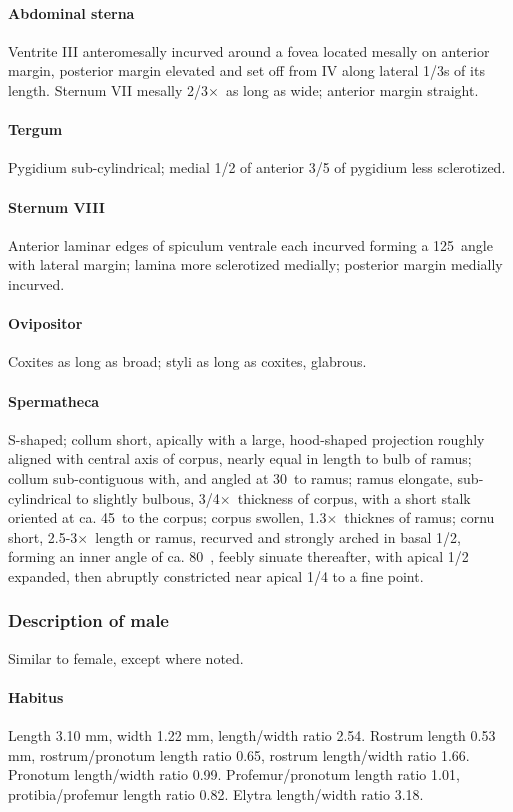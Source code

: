 \documentclass[fleqn,10pt,lineno]{wlpeerj} %
\newcommand{\td}{\textdegree~}
\newcommand{\x}{$\times$~}
\begin{document}
			\paragraph{Abdominal sterna}
				Ventrite III anteromesally incurved around a fovea located mesally on anterior margin, posterior margin elevated and set off from IV along lateral 1/3s of its length. 
				Sternum VII mesally 2/3\x as long as wide; anterior margin straight.
			\paragraph{Tergum}
				Pygidium sub-cylindrical; medial 1/2 of anterior 3/5 of pygidium less sclerotized.
			\paragraph{Sternum VIII}
				Anterior laminar edges of spiculum ventrale each incurved forming a 125\td angle with lateral margin; lamina more sclerotized medially; posterior margin medially incurved.
			\paragraph{Ovipositor}
				Coxites as long as broad; styli as long as coxites, glabrous.
			\paragraph{Spermatheca}
				S-shaped; collum short, apically with a large, hood-shaped projection roughly aligned with central axis of corpus, nearly equal in length to bulb of ramus; collum sub-contiguous with, and angled at 30\td to ramus; ramus elongate, sub-cylindrical to slightly bulbous, 3/4\x thickness of corpus, with a short stalk oriented at ca. 45\td to the corpus; corpus swollen, 1.3\x thicknes of ramus; cornu short, 2.5-3\x length or ramus, recurved and strongly arched in basal 1/2, forming an inner angle of ca. 80\td, feebly sinuate thereafter, with apical 1/2 expanded, then abruptly constricted near apical 1/4 to a fine point.
		\subsubsection*{Description of male}
			Similar to female, except where noted.
			\paragraph{Habitus}
				Length 3.10 mm, width 1.22 mm, length/width ratio 2.54. Rostrum length 0.53 mm, rostrum/pronotum length ratio 0.65, rostrum length/width ratio 1.66. Pronotum length/width ratio 0.99. Profemur/pronotum length ratio 1.01, protibia/profemur length ratio 0.82. Elytra length/width ratio 3.18.
\end{document}
